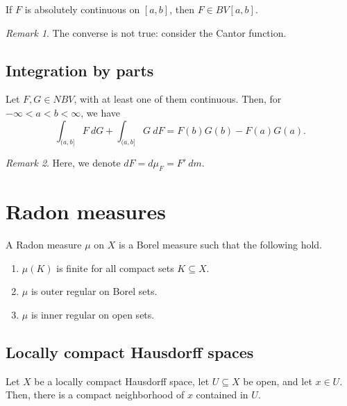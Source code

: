 \documentclass[11pt]{article}
\theoremstyle{definition}
\theoremstyle{remark}
\newtheorem*{remark}{Remark}
\begin{document}
    \begin{lemma}
        If $F$ is absolutely continuous on $[a, b]$, then $F \in BV[a, b]$.
        \begin{remark}
            The converse is not true: consider the Cantor function.
        \end{remark}
    \end{lemma}


    \subsection{Integration by parts}

    \begin{theorem}
        Let $F, G \in NBV$, with at least one of them continuous. Then, for $-\infty
        < a < b < \infty$, we have \[
            \int_{(a, b]} F\:dG + \int_{(a, b]} G\:dF = F(b)G(b) - F(a)G(a).
        \]
        \begin{remark}
            Here, we denote $dF = d\mu_F = F'\:dm$.
        \end{remark}
    \end{theorem}


    \section{Radon measures}

    \begin{definition}
        A Radon measure $\mu$ on $X$ is a Borel measure such that the following hold.
        \begin{enumerate}
            \item $\mu(K)$ is finite for all compact sets $K \subseteq X$.
            \item $\mu$ is outer regular on Borel sets.
            \item $\mu$ is inner regular on open sets.
        \end{enumerate}
    \end{definition}

    \subsection{Locally compact Hausdorff spaces}

    \begin{lemma}
        Let $X$ be a locally compact Hausdorff space, let $U \subseteq X$ be open,
        and let $x \in U$. Then, there is a compact neighborhood of $x$ contained in
        $U$.
    \end{lemma}
\end{document}
